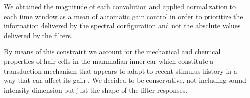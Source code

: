 {We obtained the magnitude of each convolution and applied normalization to each time window
as a mean of automatic gain control in order to prioritize the information delivered by the
spectral configuration and not the absolute values delivered by the filters. 

By means of this constraint we account for the mechanical and chemical properties of hair cells in the mammalian inner ear
which constitute a transduction mechanism that appears to adapt to recent stimulus history in a way that can affect its gain
\cite{eatock_2000,holt_2000,le_goff_2005}. 
We decided to be conservative, not including
sound intensity dimension but just the shape of the filter responses.
}















